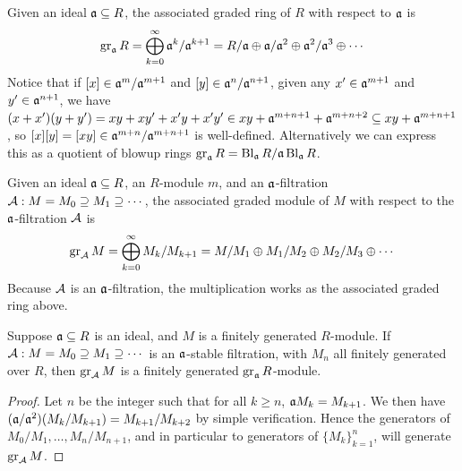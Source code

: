 \begin{definition}
    Given an ideal \(\mathfrak{a} \subseteq R\),
    the associated graded ring of \(R\) with respect to \(\mathfrak{a}\) is
    \begin{equation*}
        \operatorname{gr}_{\mathfrak{a}} R = \bigoplus_{k=0}^\infty \mathfrak{a}^k/\mathfrak{a}^{k+1}
        = R/\mathfrak{a} \oplus \mathfrak{a}/\mathfrak{a}^2 \oplus \mathfrak{a}^2/\mathfrak{a}^3 \oplus \cdots
    \end{equation*}
    Notice that if \([x] \in \mathfrak{a}^m/\mathfrak{a}^{m+1}\) and \([y] \in \mathfrak{a}^n/\mathfrak{a}^{n+1}\),
    given any \(x' \in \mathfrak{a}^{m+1}\) and \(y' \in \mathfrak{a}^{n+1}\),
    we have \((x+x')(y+y') = xy + xy' + x'y + x'y' \in xy + \mathfrak{a}^{m+n+1} + \mathfrak{a}^{m+n+2} \subseteq xy + \mathfrak{a}^{m+n+1}\),
    so \([x][y] = [xy] \in \mathfrak{a}^{m+n}/\mathfrak{a}^{m+n+1}\) is well-defined.
    Alternatively we can express this as a quotient of blowup rings
    \(\operatorname{gr}_{\mathfrak{a}} R = \operatorname{Bl}_{\mathfrak{a}}R/\mathfrak{a}\operatorname{Bl}_{\mathfrak{a}}R\).
\end{definition}
\begin{definition}
    Given an ideal \(\mathfrak{a} \subseteq R\), an \(R\)-module \(m\),
    and an \(\mathfrak{a}\)-filtration \(\mathcal{A}: M = M_0 \supseteq M_1 \supseteq \cdots\),
    the associated graded module of \(M\) with respect to the \(\mathfrak{a}\)-filtration \(\mathcal{A}\) is
    \begin{equation*}
        \operatorname{gr}_{\mathcal{A}} M = \bigoplus_{k=0}^\infty M_k/M_{k+1}
        = M/M_1 \oplus M_1/M_2 \oplus M_2/M_3 \oplus \cdots
    \end{equation*}
    Because \(\mathcal{A}\) is an \(\mathfrak{a}\)-filtration, the multiplication works as the associated graded ring above.
\end{definition}

\begin{proposition}
    Suppose \(\mathfrak{a} \subseteq R\) is an ideal, and \(M\) is a finitely generated \(R\)-module.
    If \(\mathcal{A}: M = M_0 \supseteq M_1 \supseteq \cdots\) is an \(\mathfrak{a}\)-stable filtration,
    with \(M_n\) all finitely generated over \(R\),
    then \(\operatorname{gr}_{\mathcal{A}} M\) is a finitely generated \(\operatorname{gr}_{\mathfrak{a}} R\)-module.
\end{proposition}
\begin{proof}
    Let \(n\) be the integer such that for all \(k \geq n\), \(\mathfrak{a}M_k = M_{k+1}\).
    We then have \((\mathfrak{a}/\mathfrak{a}^2)(M_k/M_{k+1}) = M_{k+1}/M_{k+2}\) by simple verification.
    Hence the generators of \(M_0/M_1,\hdots,M_n/M_{n+1}\),
    and in particular to generators of \({\{M_k\}}_{k=1}^n\),
    will generate \(\operatorname{gr}_{\mathcal{A}} M\).
\end{proof}

